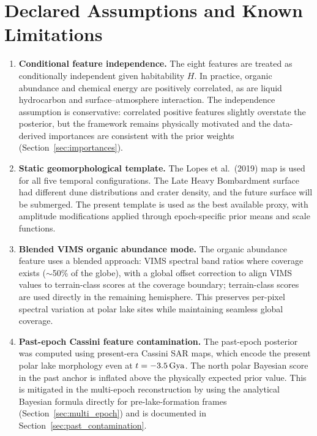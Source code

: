 \chapter{Declared Assumptions and Known Limitations}
\label{app:assumptions}

\begin{enumerate}[leftmargin=*,label=\textbf{A\arabic*.}]

\item \textbf{Conditional feature independence.}  The eight features are
treated as conditionally independent given habitability $H$.  In
practice, organic abundance and chemical energy are positively
correlated, as are liquid hydrocarbon and surface--atmosphere
interaction.  The independence assumption is conservative: correlated
positive features slightly overstate the posterior, but the framework
remains physically motivated and the data-derived importances are
consistent with the prior weights (Section~\ref{sec:importances}).

\item \textbf{Static geomorphological template.}  The Lopes et al.\
(2019) map is used for all five temporal configurations.  The
Late Heavy Bombardment surface had different dune distributions and
crater density, and the future surface will be submerged.  The present
template is used as the best available proxy, with amplitude
modifications applied through epoch-specific prior means and scale
functions.

\item \textbf{Blended VIMS organic abundance mode.}  The organic abundance
feature uses a blended approach: VIMS spectral band ratios where
coverage exists ($\sim$50\% of the globe), with a global offset
correction to align VIMS values to terrain-class scores at the coverage
boundary; terrain-class scores are used directly in the remaining
hemisphere.  This preserves per-pixel spectral variation at polar
lake sites while maintaining seamless global coverage.

\item \textbf{Past-epoch Cassini feature contamination.}  The past-epoch
posterior was computed using present-era Cassini SAR maps, which
encode the present polar lake morphology even at $t = -3.5\,\text{Gya}$.
The north polar Bayesian score in the past anchor is inflated above the
physically expected prior value.  This is mitigated in the multi-epoch
reconstruction by using the analytical Bayesian formula directly for
pre-lake-formation frames (Section~\ref{sec:multi_epoch}) and is
documented in Section~\ref{sec:past_contamination}.


\end{enumerate}
